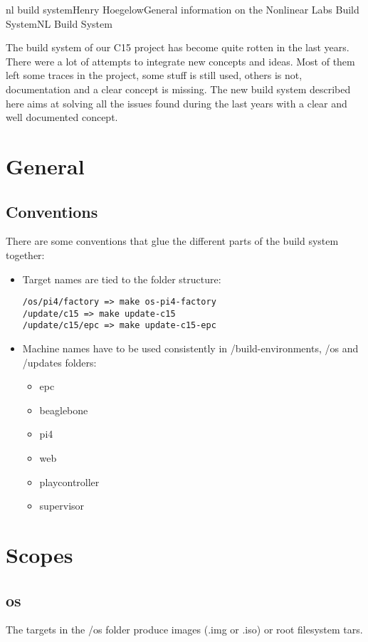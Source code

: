 \documentclass[11pt]{article}
\begin{document}
\begin{Name}{1}{nl build system}{Henry Hoegelow}{General information on the Nonlinear Labs Build System}{NL Build System}

The build system of our C15 project has become quite rotten in the last years. There were a lot of attempts to integrate new concepts and ideas. Most of them left some traces in the project, some stuff is still used, others is not, documentation and a clear concept is missing. The new build system described here aims at solving all the issues found during the last years with a clear and well documented concept.

\section{General}

\subsection{Conventions}
There are some conventions that glue the different parts of the build system together:
\begin{itemize}
\item Target names are tied to the folder structure: 
\begin{verbatim}
/os/pi4/factory => make os-pi4-factory
/update/c15 => make update-c15
/update/c15/epc => make update-c15-epc
\end{verbatim}
\item Machine names have to be used consistently in /build-environments, /os and /updates folders:
\begin{itemize} \label{machine}
\item epc
\item beaglebone
\item pi4
\item web
\item playcontroller
\item supervisor
\end{itemize}
\end{itemize}

\section{Scopes}

\subsection{os}
The targets in the /os folder produce images (.img or .iso) or root filesystem tars. 


\end{Name}
\end{document}
